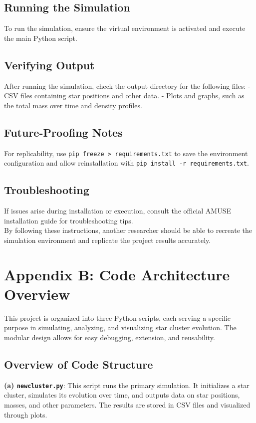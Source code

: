 \documentclass[10pt,twocolumn]{article}
\begin{document}
\subsection{Running the Simulation}
To run the simulation, ensure the virtual environment is activated and execute the main Python script.

\subsection{Verifying Output}
After running the simulation, check the output directory for the following files:
- CSV files containing star positions and other data.
- Plots and graphs, such as the total mass over time and density profiles.

\subsection{Future-Proofing Notes}
For replicability, use \texttt{pip freeze > requirements.txt} to save the environment configuration and allow reinstallation with \texttt{pip install -r requirements.txt}.

\subsection{Troubleshooting}
If issues arise during installation or execution, consult the official AMUSE installation guide for troubleshooting tips. \\

By following these instructions, another researcher should be able to recreate the simulation environment and replicate the project results accurately.

\section{Appendix B: Code Architecture Overview}

This project is organized into three Python scripts, each serving a specific purpose in simulating, analyzing, and visualizing star cluster evolution. The modular design allows for easy debugging, extension, and reusability.

\subsection{Overview of Code Structure}

\textbf{(a) \texttt{newcluster.py}}: This script runs the primary simulation. It initializes a star cluster, simulates its evolution over time, and outputs data on star positions, masses, and other parameters. The results are stored in CSV files and visualized through plots.
\end{document}
